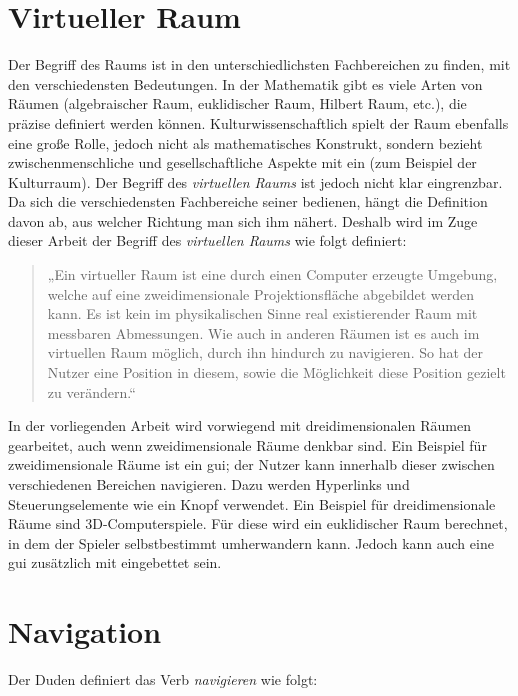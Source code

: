 \section{Virtueller Raum}
Der Begriff des Raums ist in den unterschiedlichsten Fachbereichen zu finden, mit den verschiedensten Bedeutungen.
In der Mathematik gibt es viele Arten von Räumen (algebraischer Raum, euklidischer Raum, Hilbert Raum, etc.), die präzise definiert werden können.
Kulturwissenschaftlich spielt der Raum ebenfalls eine große Rolle, jedoch nicht als mathematisches Konstrukt, sondern bezieht zwischenmenschliche und gesellschaftliche Aspekte mit ein (zum Beispiel der Kulturraum).
Der Begriff des \textit{virtuellen Raums} ist jedoch nicht klar eingrenzbar.
Da sich die verschiedensten Fachbereiche seiner bedienen, hängt die Definition davon ab, aus welcher Richtung man sich ihm nähert.
Deshalb wird im Zuge dieser Arbeit der Begriff des \textit{virtuellen Raums} wie folgt definiert:

\begin{quote}
    „Ein virtueller Raum ist eine durch einen Computer erzeugte Umgebung, welche auf eine zweidimensionale Projektionsfläche abgebildet werden kann.
    Es ist kein im physikalischen Sinne real existierender Raum mit messbaren Abmessungen.
    Wie auch in anderen Räumen ist es auch im virtuellen Raum möglich, durch ihn hindurch zu navigieren.
    So hat der Nutzer eine Position in diesem, sowie die Möglichkeit diese Position gezielt zu verändern.“
\end{quote}

In der vorliegenden Arbeit wird vorwiegend mit dreidimensionalen Räumen gearbeitet, auch wenn zweidimensionale Räume denkbar sind.
Ein Beispiel für zweidimensionale Räume ist ein \ac{gui}; der Nutzer kann innerhalb dieser zwischen verschiedenen Bereichen navigieren.
Dazu werden Hyperlinks und Steuerungselemente wie ein Knopf verwendet.
Ein Beispiel für dreidimensionale Räume sind 3D-Computerspiele.
Für diese wird ein euklidischer Raum berechnet, in dem der Spieler selbstbestimmt umherwandern kann.
Jedoch kann auch eine \ac{gui} zusätzlich mit eingebettet sein.

\section{Navigation}
Der Duden definiert das Verb \textit{navigieren} wie folgt:

